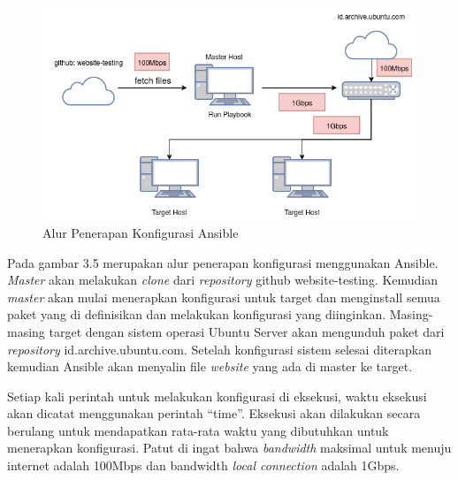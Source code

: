 \documentclass[10pt,twoside]{report}
\begin{document}
\begin{adjustwidth}{20pt}{}
	\begin{figure}[H]
		\centering
		\includegraphics[width=\textwidth]{images/ansible-topology-revision.png}
		\caption{Alur Penerapan Konfigurasi Ansible}
	\end{figure}
	Pada gambar 3.5 merupakan alur penerapan konfigurasi menggunakan Ansible.
	\textit{Master} akan melakukan \textit{clone} dari \textit{repository} github
	website-testing. Kemudian \textit{master} akan mulai menerapkan konfigurasi
	untuk target dan menginstall semua paket yang di definisikan dan melakukan
	konfigurasi yang diinginkan. Masing-masing target dengan sistem operasi
	Ubuntu Server akan mengunduh paket dari \textit{repository}
	id.archive.ubuntu.com.
	Setelah konfigurasi sistem selesai diterapkan kemudian Ansible akan menyalin
	file \textit{website} yang ada di master ke target.

	Setiap kali perintah untuk melakukan konfigurasi di eksekusi, waktu eksekusi
	akan dicatat menggunakan perintah “time”. Eksekusi akan dilakukan secara
	berulang untuk mendapatkan rata-rata waktu yang dibutuhkan untuk menerapkan
	konfigurasi.
	Patut di ingat bahwa \textit{bandwidth} maksimal untuk menuju internet
	adalah 100Mbps dan bandwidth \textit{local connection} adalah 1Gbps.
\end{adjustwidth}
\end{document}
